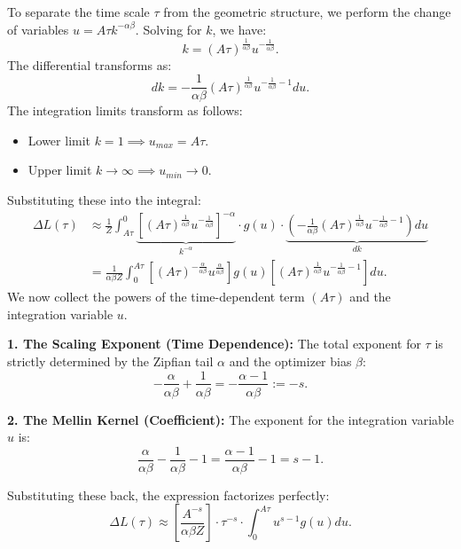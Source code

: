 \documentclass{article}
\theoremstyle{plain}
\theoremstyle{definition}
\theoremstyle{remark}
\begin{document}
To separate the time scale $\tau$ from the geometric structure, we perform the change of variables $u = A \tau k^{-\alpha\beta}$.
Solving for $k$, we have:
\begin{equation*}
    k = (A \tau)^{\frac{1}{\alpha\beta}} u^{-\frac{1}{\alpha\beta}}.
\end{equation*}
The differential transforms as:
\begin{equation*}
    dk = -\frac{1}{\alpha\beta} (A \tau)^{\frac{1}{\alpha\beta}} u^{-\frac{1}{\alpha\beta}-1} du.
\end{equation*}
The integration limits transform as follows:
\begin{itemize}
    \item Lower limit $k=1 \implies u_{max} = A \tau$.
    \item Upper limit $k \to \infty \implies u_{min} \to 0$.
\end{itemize}
Substituting these into the integral:
\begin{align*}
    \Delta L(\tau) &\approx \frac{1}{Z} \int_{A\tau}^{0} \underbrace{\left[ (A \tau)^{\frac{1}{\alpha\beta}} u^{-\frac{1}{\alpha\beta}} \right]^{-\alpha}}_{k^{-\alpha}} \cdot g(u) \cdot \underbrace{\left( -\frac{1}{\alpha\beta} (A \tau)^{\frac{1}{\alpha\beta}} u^{-\frac{1}{\alpha\beta}-1} \right) du}_{dk} \\
    &= \frac{1}{\alpha\beta Z} \int_{0}^{A\tau} \left[ (A \tau)^{-\frac{\alpha}{\alpha\beta}} u^{\frac{\alpha}{\alpha\beta}} \right] g(u) \left[ (A \tau)^{\frac{1}{\alpha\beta}} u^{-\frac{1}{\alpha\beta}-1} \right] du.
\end{align*}
We now collect the powers of the time-dependent term $(A \tau)$ and the integration variable $u$.

\textbf{1. The Scaling Exponent (Time Dependence):}
The total exponent for $\tau$ is strictly determined by the Zipfian tail $\alpha$ and the optimizer bias $\beta$:
\begin{equation*}
    -\frac{\alpha}{\alpha\beta} + \frac{1}{\alpha\beta} = -\frac{\alpha-1}{\alpha\beta} := -s.
\end{equation*}

\textbf{2. The Mellin Kernel (Coefficient):}
The exponent for the integration variable $u$ is:
\begin{equation*}
    \frac{\alpha}{\alpha\beta} - \frac{1}{\alpha\beta} - 1 = \frac{\alpha-1}{\alpha\beta} - 1 = s - 1.
\end{equation*}

Substituting these back, the expression factorizes perfectly:
\begin{equation*}
    \Delta L(\tau) \approx \left[ \frac{A^{-s}}{\alpha\beta Z} \right] \cdot \tau^{-s} \cdot \int_{0}^{A\tau} u^{s-1} g(u) du.
\end{equation*}
\end{document}
